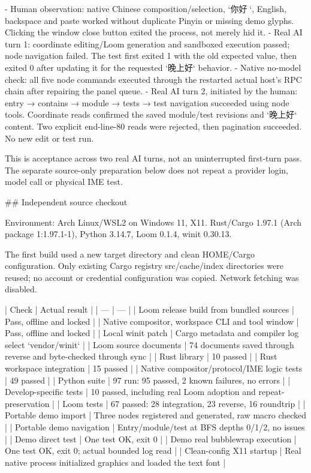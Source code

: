 - Human observation: native Chinese composition/selection, `你好👋`, English,
  backspace and paste worked without duplicate Pinyin or missing demo glyphs.
  Clicking the window close button exited the process, not merely hid it.
- Real AI turn 1: coordinate editing/Loom generation and sandboxed execution
  passed; node navigation failed. The test first exited 1 with the old expected
  value, then exited 0 after updating it for the requested `晚上好` behavior.
- Native no-model check: all five node commands executed through the restarted
  actual host's RPC chain after repairing the panel queue.
- Real AI turn 2, initiated by the human: entry → contains → module → tests →
  test navigation succeeded using node tools. Coordinate reads confirmed the
  saved module/test revisions and `晚上好` content. Two explicit end-line-80
  reads were rejected, then pagination succeeded. No new edit or test run.

This is acceptance across two real AI turns, not an uninterrupted first-turn
pass. The separate source-only preparation below does not repeat a provider
login, model call or physical IME test.

## Independent source checkout

Environment: Arch Linux/WSL2 on Windows 11, X11. Rust/Cargo 1.97.1
(Arch package 1:1.97.1-1), Python 3.14.7, Loom 0.1.4, winit 0.30.13.

The first build used a new target directory and clean HOME/Cargo configuration.
Only existing Cargo registry src/cache/index directories were reused; no account
or credential configuration was copied. Network fetching was disabled.

| Check | Actual result |
| --- | --- |
| Loom release build from bundled sources | Pass, offline and locked |
| Native compositor, workspace CLI and tool window | Pass, offline and locked |
| Local winit patch | Cargo metadata and compiler log select `vendor/winit` |
| Loom source documents | 74 documents saved through reverse and byte-checked through sync |
| Rust library | 10 passed |
| Rust workspace integration | 15 passed |
| Native compositor/protocol/IME logic tests | 49 passed |
| Python suite | 97 run: 95 passed, 2 known failures, no errors |
| Develop-specific tests | 10 passed, including real Loom adoption and repeat-preservation |
| Loom tests | 67 passed: 28 integration, 23 reverse, 16 roundtrip |
| Portable demo import | Three nodes registered and generated, raw macro checked |
| Portable demo navigation | Entry/module/test at BFS depths 0/1/2, no issues |
| Demo direct test | One test OK, exit 0 |
| Demo real bubblewrap execution | One test OK, exit 0; actual bounded log read |
| Clean-config X11 startup | Real native process initialized graphics and loaded the text font |

